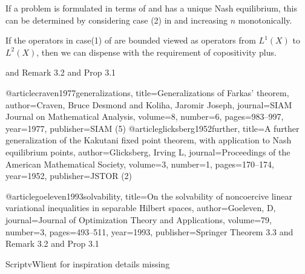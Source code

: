 \begin{corollary}
  If a problem is formulated in terms of  and has a unique Nash equilibrium, this can be determined by considering case (2) in  and increasing $n$ monotonically.
\end{corollary}
\begin{corollary}
  If the operators in case(1) of  are bounded viewed as operators from $L^1(X)$ to $L^2(X)$, then we can dispense with the requirement of copositivity plus.
\end{corollary}
\begin{corollary}
  and Remark 3.2 and Prop 3.1
\end{corollary}
\begin{example}

\end{example}



@article{craven1977generalizations,
  title={Generalizations of Farkas’ theorem},
  author={Craven, Bruce Desmond and Koliha, Jaromir Joseph},
  journal={SIAM Journal on Mathematical Analysis},
  volume={8},
  number={6},
  pages={983--997},
  year={1977},
  publisher={SIAM}
}
(5)
@article{glicksberg1952further,
  title={A further generalization of the Kakutani fixed point theorem, with application to Nash equilibrium points},
  author={Glicksberg, Irving L},
  journal={Proceedings of the American Mathematical Society},
  volume={3},
  number={1},
  pages={170--174},
  year={1952},
  publisher={JSTOR}
}
(2)


@article{goeleven1993solvability,
  title={On the solvability of noncoercive linear variational inequalities in separable Hilbert spaces},
  author={Goeleven, D},
  journal={Journal of Optimization Theory and Applications},
  volume={79},
  number={3},
  pages={493--511},
  year={1993},
  publisher={Springer}
}
Theorem 3.3 and Remark 3.2 and Prop 3.1

ScriptvWlient for inspiration details missing
